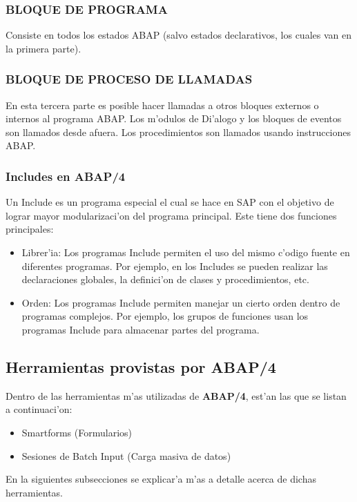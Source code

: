 \subsubsection*{BLOQUE DE PROGRAMA}
	Consiste en todos los estados ABAP (salvo estados declarativos, los cuales van en la primera parte).
	
\subsubsection*{BLOQUE DE PROCESO DE LLAMADAS}
	En esta tercera parte es posible hacer llamadas a otros bloques externos o internos al programa ABAP. Los m'odulos de Di'alogo y los bloques de eventos son llamados desde afuera. Los procedimientos son llamados usando instrucciones ABAP. 
	
\subsubsection{Includes en ABAP/4}
	Un Include es un programa especial el cual se hace en SAP con el objetivo de lograr mayor modularizaci'on del programa principal.
	Este tiene dos funciones principales:
\begin{itemize}
\item Librer'ia: Los programas Include permiten el uso del mismo c'odigo fuente en diferentes programas. Por ejemplo, en los Includes se pueden realizar las declaraciones globales, la definici'on de clases y procedimientos, etc.
\item Orden: Los programas Include permiten manejar un cierto orden dentro de programas complejos. Por ejemplo, los grupos de funciones usan los programas Include para almacenar partes del programa. 
\end{itemize}
	

\subsection{Herramientas provistas por ABAP/4}
	Dentro de las herramientas m'as utilizadas de \textbf{ABAP/4}, est'an las que se listan a continuaci'on:
\begin{itemize}
\item Smartforms (Formularios)
\item Sesiones de Batch Input (Carga masiva de datos)
\end{itemize} 
	En la siguientes subsecciones se explicar'a m'as a detalle acerca de dichas herramientas.
	
